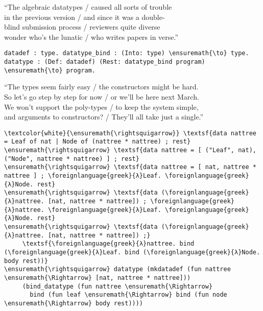 \importantCodeblockEnd{}

\begin{versy}
``The algebraic datatypes / caused all sorts of trouble \\
in the previous version / and since it was a double- \\
blind submission process / reviewers quite diverse \\
wonder who's the lunatic / who writes papers in verse.''
\end{versy}

\begin{verbatim}
datadef : type. datatype_bind : (Into: type) \ensuremath{\to} type.
datatype : (Def: datadef) (Rest: datatype_bind program) \ensuremath{\to} program.
\end{verbatim}

\begin{versy}
``The types seem fairly easy / the constructors might be hard. \\
So let's go step by step for now / or we'll be here next March. \\
We won't support the poly-types / to keep the system simple, \\
and arguments to constructors? / They'll all take just a single.''
\end{versy}

\begin{verbatim}
\textcolor{white}{\ensuremath{\rightsquigarrow}} \textsf{data nattree = Leaf of nat | Node of (nattree * nattree) ; rest}
\ensuremath{\rightsquigarrow} \textsf{data nattree = [ ("Leaf", nat), ("Node", nattree * nattree) ] ; rest}
\ensuremath{\rightsquigarrow} \textsf{data nattree = [ nat, nattree * nattree ] ; \foreignlanguage{greek}{λ}Leaf. \foreignlanguage{greek}{λ}Node. rest}
\ensuremath{\rightsquigarrow} \textsf{data (\foreignlanguage{greek}{λ}nattree. [nat, nattree * nattree]) ; \foreignlanguage{greek}{λ}nattree. \foreignlanguage{greek}{λ}Leaf. \foreignlanguage{greek}{λ}Node. rest}
\ensuremath{\rightsquigarrow} \textsf{data (\foreignlanguage{greek}{λ}nattree. [nat, nattree * nattree]) ;}
     \textsf{\foreignlanguage{greek}{λ}nattree. bind (\foreignlanguage{greek}{λ}Leaf. bind (\foreignlanguage{greek}{λ}Node. body rest))}
\ensuremath{\rightsquigarrow} datatype (mkdatadef (fun nattree \ensuremath{\Rightarrow} [nat, nattree * nattree]))
     (bind_datatype (fun nattree \ensuremath{\Rightarrow}
       bind (fun leaf \ensuremath{\Rightarrow} bind (fun node \ensuremath{\Rightarrow} body rest))))
\end{verbatim}

